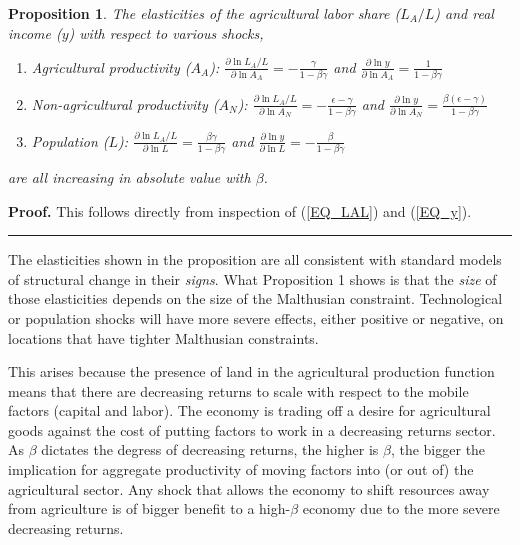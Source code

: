\documentclass[11pt]{article}
\newtheorem{proposition}{Proposition}
\newenvironment{proof}[1][Proof]{\noindent\textbf{#1.} }{\ \rule{0.5em}{0.5em}}
\begin{document}
\begin{proposition}
The elasticities of the agricultural labor share ($L_A/L$) and real income ($y$) with respect to various shocks,
\begin{enumerate}
	\item[(a)] Agricultural productivity ($A_A$): $\frac{\partial \ln L_A/L}{\partial \ln A_A} = - \frac{\gamma}{1-\beta\gamma}$ and $\frac{\partial \ln y}{\partial \ln A_A} = \frac{1}{1-\beta\gamma}$
	\item[(b)] Non-agricultural productivity ($A_N$): $\frac{\partial \ln L_A/L}{\partial \ln A_N} = - \frac{\epsilon-\gamma}{1-\beta\gamma}$ and $\frac{\partial \ln y}{\partial \ln A_N} = \frac{\beta(\epsilon-\gamma)}{1-\beta\gamma}$
	\item[(c)] Population ($L$): $\frac{\partial \ln L_A/L}{\partial \ln L} = \frac{\beta\gamma}{1-\beta\gamma}$ and $\frac{\partial \ln y}{\partial \ln L} = - \frac{\beta}{1-\beta\gamma}$
\end{enumerate}
are all increasing in absolute value with $\beta$.
\end{proposition}
\begin{proof}
This follows directly from inspection of (\ref{EQ_LAL}) and (\ref{EQ_y}).
\end{proof}

\vspace{.3cm} The elasticities shown in the proposition are all consistent with standard models of structural change \citep{kp2001,Gollin:2007oq,Restuccia:2008hc,Gollin:2010ys,vollrath2011,Alvarez-Cuadrado:2011nx,hrv2014,duarte2010role} in their \textit{signs}. What Proposition 1 shows is that the \textit{size} of those elasticities depends on the size of the Malthusian constraint. Technological or population shocks will have more severe effects, either positive or negative, on locations that have tighter Malthusian constraints. 

This arises because the presence of land in the agricultural production function means that there are decreasing returns to scale with respect to the mobile factors (capital and labor). The economy is trading off a desire for agricultural goods against the cost of putting factors to work in a decreasing returns sector. As $\beta$ dictates the degress of decreasing returns, the higher is $\beta$, the bigger the implication for aggregate productivity of moving factors into (or out of) the agricultural sector. Any shock that allows the economy to shift resources away from agriculture is of bigger benefit to a high-$\beta$ economy due to the more severe decreasing returns. 
\end{document}
